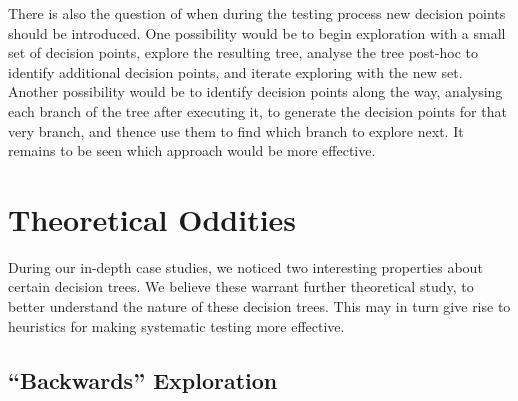 There is also the question of when during the testing process new decision points should be introduced.
One possibility would be to begin exploration with a small set of decision points, explore the resulting tree, analyse the tree post-hoc to identify additional decision points, and iterate exploring with the new set.
Another possibility would be to identify decision points along the way, analysing each branch of the tree after executing it, to generate the decision points for that very branch, and thence use them to find which branch to explore next.
It remains to be seen which approach would be more effective.


\section{Theoretical Oddities}
\label{sec:future-theory}

During our in-depth case studies, we noticed two interesting properties about certain decision trees. We believe these warrant further theoretical study, to better understand the nature of these decision trees. This may in turn give rise to heuristics for making systematic testing more effective.

\subsection{``Backwards'' Exploration}
\label{sec:future-backwards}


